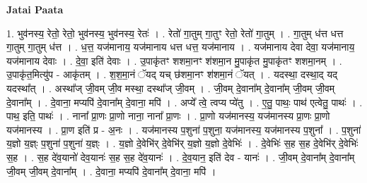 \documentclass[17pt]{extarticle}
\begin{document}
\textbf{Jatai Paata} \newline

1. भुव॑नस्य॒ रेतो॒ रेतो॒ भुव॑नस्य॒ भुव॑नस्य॒ रेतः॑ । . रेतो॑ गा॒तुम् गा॒तुꣳ रेतो॒ रेतो॑ गा॒तुम् । . गा॒तुम् ध॑त्त धत्त गा॒तुम् गा॒तुम् ध॑त्त । . ध॒त्त॒ यज॑मानाय॒ यज॑मानाय धत्त धत्त॒ यज॑मानाय । . यज॑मानाय देवा देवा॒ यज॑मानाय॒ यज॑मानाय देवाः । . दे॒वा॒ इति॑ देवाः । . उ॒पाकृ॑तꣳ शशमा॒नꣳ श॑शमा॒न मु॒पाकृ॑त मु॒पाकृ॑तꣳ शशमा॒नम् । . उ॒पाकृ॑त॒मित्यु॑प - आकृ॑तम् । . श॒श॒मा॒नं ॅयद् यच् छ॑शमा॒नꣳ श॑शमा॒नं ॅयत् । . यदस्था॒ दस्था॒द् यद् यदस्था᳚त् । . अस्था᳚ज् जी॒वम् जी॒व मस्था॒ दस्था᳚ज् जी॒वम् । . जी॒वम् दे॒वाना᳚म् दे॒वाना᳚म् जी॒वम् जी॒वम् दे॒वाना᳚म् । . दे॒वाना॒ मप्यपि॑ दे॒वाना᳚म् दे॒वाना॒ मपि॑ । . अप्ये᳚ त्वे॒ त्वप्य प्ये॑तु । . ए॒तु॒ पाथः॒ पाथ॑ एत्वेतु॒ पाथः॑ । . पाथ॒ इति॒ पाथः॑ । . नाना᳚ प्रा॒णः प्रा॒णो नाना॒ नाना᳚ प्रा॒णः । . प्रा॒णो यज॑मानस्य॒ यज॑मानस्य प्रा॒णः प्रा॒णो यज॑मानस्य । . प्रा॒ण इति॑ प्र - अ॒नः । . यज॑मानस्य प॒शुना॑ प॒शुना॒ यज॑मानस्य॒ यज॑मानस्य प॒शुना᳚ । . प॒शुना॑ य॒ज्ञो य॒ज्ञ्ः प॒शुना॑ प॒शुना॑ य॒ज्ञ्ः । . य॒ज्ञो दे॒वेभि॑र् दे॒वेभि॑र् य॒ज्ञो य॒ज्ञो दे॒वेभिः॑ । . दे॒वेभिः॑ स॒ह स॒ह दे॒वेभि॑र् दे॒वेभिः॑ स॒ह । . स॒ह दे॑व॒यानो॑ देव॒यानः॑ स॒ह स॒ह दे॑व॒यानः॑ । . दे॒व॒यान॒ इति॑ देव - यानः॑ । . जी॒वम् दे॒वाना᳚म् दे॒वाना᳚म् जी॒वम् जी॒वम् दे॒वाना᳚म् । . दे॒वाना॒ मप्यपि॑ दे॒वाना᳚म् दे॒वाना॒ मपि॑ । \newline
\end{document}
